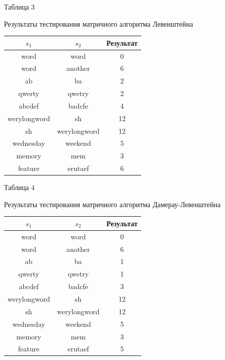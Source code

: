 \documentclass[a4paper,12pt]{article}
\begin{document}
\begin{flushright}
    Таблица 3
\end{flushright}

\begin{center}
    Результаты тестирования матричного алгоритма Левенштейна

    \begin{tabular}{|c|c|c|}
        \hline
        $s_1$ & $s_2$ & Результат \\
        \hline
        word & word & 0 \\
        \hline
        word & another & 6 \\
        \hline
        ab & ba & 2 \\
        \hline
        qwerty & qwetry & 2 \\
        \hline
        abcdef & badcfe & 4 \\
        \hline
        werylongword & sh & 12 \\
        \hline
        sh & werylongword & 12 \\
        \hline
        wednesday & weekend & 5 \\
        \hline
        memory & mem & 3 \\
        \hline
        feature & erutaef & 6 \\
        \hline
    \end{tabular}
\end{center}

\hfill

\begin{flushright}
    Таблица 4
\end{flushright}

\begin{center}
    Результаты тестирования матричного алгоритма Дамерау-Левенштейна

    \begin{tabular}{|c|c|c|}
        \hline
        $s_1$ & $s_2$ & Результат \\
        \hline
        word & word & 0 \\
        \hline
        word & another & 6 \\
        \hline
        ab & ba & 1 \\
        \hline
        qwerty & qwetry & 1 \\
        \hline
        abcdef & badcfe & 3 \\
        \hline
        werylongword & sh & 12 \\
        \hline
        sh & werylongword & 12 \\
        \hline
        wednesday & weekend & 5 \\
        \hline
        memory & mem & 3 \\
        \hline
        feature & erutaef & 5 \\
        \hline
    \end{tabular}
\end{center}
\end{document}
